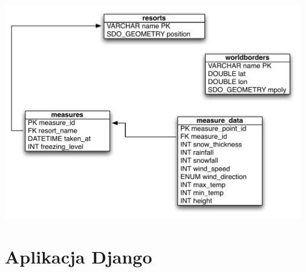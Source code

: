 \documentclass[12pt]{article}
\begin{document}
\includegraphics[width=35em]{images/erd_diagram.pdf}

\section{Aplikacja Django}
\end{document}
